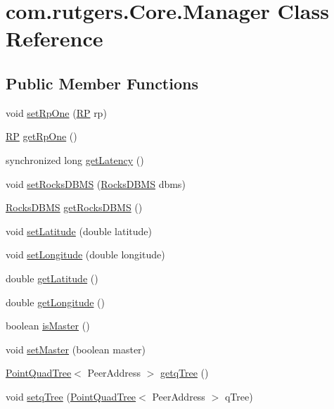 \hypertarget{classcom_1_1rutgers_1_1Core_1_1Manager}{}\section{com.\+rutgers.\+Core.\+Manager Class Reference}
\label{classcom_1_1rutgers_1_1Core_1_1Manager}
\subsection*{Public Member Functions}
\begin{DoxyCompactItemize}
\item 
void \hyperlink{classcom_1_1rutgers_1_1Core_1_1Manager_adbd253cc2bb0c2b905702bc9b214364e}{set\+Rp\+One} (\hyperlink{classcom_1_1rutgers_1_1Core_1_1RP}{RP} rp)
\item 
\hyperlink{classcom_1_1rutgers_1_1Core_1_1RP}{RP} \hyperlink{classcom_1_1rutgers_1_1Core_1_1Manager_aea68f7e919ad032b36085124e38431d1}{get\+Rp\+One} ()
\item 
synchronized long \hyperlink{classcom_1_1rutgers_1_1Core_1_1Manager_abe5c0bf3e6854ec547c1a022c12837b1}{get\+Latency} ()
\item 
void \hyperlink{classcom_1_1rutgers_1_1Core_1_1Manager_ae4f9a9930d85b52eb2ce3b69d2213d11}{set\+Rocks\+D\+B\+MS} (\hyperlink{classcom_1_1rutgers_1_1DB_1_1RocksDBMS}{Rocks\+D\+B\+MS} dbms)
\item 
\hyperlink{classcom_1_1rutgers_1_1DB_1_1RocksDBMS}{Rocks\+D\+B\+MS} \hyperlink{classcom_1_1rutgers_1_1Core_1_1Manager_a04e680889d4e29de3e18e8fe18f0e99e}{get\+Rocks\+D\+B\+MS} ()
\item 
void \hyperlink{classcom_1_1rutgers_1_1Core_1_1Manager_a4803749462ebf23b95f384bb9215c52c}{set\+Latitude} (double latitude)
\item 
void \hyperlink{classcom_1_1rutgers_1_1Core_1_1Manager_a7e1ca7f9d0791baaf3b2a839dacbdc0e}{set\+Longitude} (double longitude)
\item 
double \hyperlink{classcom_1_1rutgers_1_1Core_1_1Manager_aea86a8ba9d78dc6c6b0f6ed5e862c70d}{get\+Latitude} ()
\item 
double \hyperlink{classcom_1_1rutgers_1_1Core_1_1Manager_aea1529f07fb8579f95b51e9463af525b}{get\+Longitude} ()
\item 
boolean \hyperlink{classcom_1_1rutgers_1_1Core_1_1Manager_a0f6d15208fafb97bf0e93ba3b02650bc}{is\+Master} ()
\item 
void \hyperlink{classcom_1_1rutgers_1_1Core_1_1Manager_ac1a4df15343f09e222e19aecc1a2c6f6}{set\+Master} (boolean master)
\item 
\hyperlink{classcom_1_1rutgers_1_1QuadTree_1_1PointQuadTree}{Point\+Quad\+Tree}$<$ Peer\+Address $>$ \hyperlink{classcom_1_1rutgers_1_1Core_1_1Manager_afdfd0fe7b73ad6e3db515ff370095e20}{getq\+Tree} ()
\item 
void \hyperlink{classcom_1_1rutgers_1_1Core_1_1Manager_ab77114e891d4055addf589da5bd5c089}{setq\+Tree} (\hyperlink{classcom_1_1rutgers_1_1QuadTree_1_1PointQuadTree}{Point\+Quad\+Tree}$<$ Peer\+Address $>$ q\+Tree)
\end{DoxyCompactItemize}
